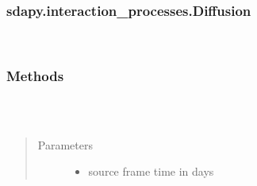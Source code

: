 \documentclass[letterpaper,10pt,english]{sphinxmanual}
\begin{document}
\subsubsection{sdapy.interaction\_processes.Diffusion}
\label{\detokenize{generated/sdapy.interaction_processes.Diffusion:sdapy-interaction-processes-diffusion}}\label{\detokenize{generated/sdapy.interaction_processes.Diffusion::doc}}

\begin{fulllineitems}
\label{\detokenize{generated/sdapy.interaction_processes.Diffusion:sdapy.interaction_processes.Diffusion}}~\subsubsection*{Methods}


\begin{savenotes}\sphinxattablestart
\centering
\begin{tabulary}{\linewidth}[t]{|T|T|}
\hline

&\\
\hline
\end{tabulary}
\par
\sphinxattableend\end{savenotes}

\begin{fulllineitems}
\label{\detokenize{generated/sdapy.interaction_processes.Diffusion:sdapy.interaction_processes.Diffusion.__init__}}~\begin{quote}\begin{description}
\item[{Parameters}] \leavevmode\begin{itemize}
\item {} 
 \textendash{} source frame time in days


\end{itemize}
\end{description}
\end{quote}
\end{fulllineitems}
\end{fulllineitems}
\end{document}
